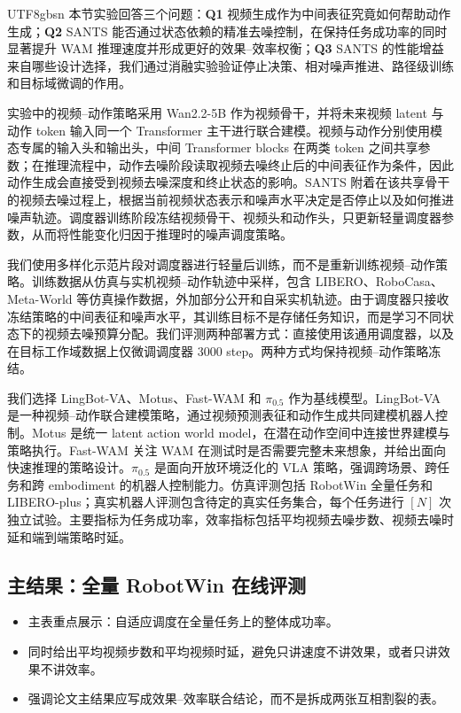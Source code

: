 \documentclass{article}
\begin{document}
\begin{CJK*}{UTF8}{gbsn}
本节实验回答三个问题：\textbf{Q1} 视频生成作为中间表征究竟如何帮助动作生成；\textbf{Q2} SANTS 能否通过状态依赖的精准去噪控制，在保持任务成功率的同时显著提升 WAM 推理速度并形成更好的效果--效率权衡；\textbf{Q3} SANTS 的性能增益来自哪些设计选择，我们通过消融实验验证停止决策、相对噪声推进、路径级训练和目标域微调的作用。

实验中的视频--动作策略采用 Wan2.2-5B 作为视频骨干，并将未来视频 latent 与动作 token 输入同一个 Transformer 主干进行联合建模。视频与动作分别使用模态专属的输入头和输出头，中间 Transformer blocks 在两类 token 之间共享参数；在推理流程中，动作去噪阶段读取视频去噪终止后的中间表征作为条件，因此动作生成会直接受到视频去噪深度和终止状态的影响。SANTS 附着在该共享骨干的视频去噪过程上，根据当前视频状态表示和噪声水平决定是否停止以及如何推进噪声轨迹。调度器训练阶段冻结视频骨干、视频头和动作头，只更新轻量调度器参数，从而将性能变化归因于推理时的噪声调度策略。

我们使用多样化示范片段对调度器进行轻量后训练，而不是重新训练视频--动作策略。训练数据从仿真与实机视频--动作轨迹中采样，包含 LIBERO、RoboCasa、Meta-World 等仿真操作数据，外加部分公开和自采实机轨迹。由于调度器只接收冻结策略的中间表征和噪声水平，其训练目标不是存储任务知识，而是学习不同状态下的视频去噪预算分配。我们评测两种部署方式：直接使用该通用调度器，以及在目标工作域数据上仅微调调度器 \(3000\) step。两种方式均保持视频--动作策略冻结。

我们选择 LingBot-VA、Motus、Fast-WAM 和 \(\pi_{0.5}\) 作为基线模型。LingBot-VA 是一种视频--动作联合建模策略，通过视频预测表征和动作生成共同建模机器人控制。Motus 是统一 latent action world model，在潜在动作空间中连接世界建模与策略执行。Fast-WAM 关注 WAM 在测试时是否需要完整未来想象，并给出面向快速推理的策略设计。\(\pi_{0.5}\) 是面向开放环境泛化的 VLA 策略，强调跨场景、跨任务和跨 embodiment 的机器人控制能力。仿真评测包括 RobotWin 全量任务和 LIBERO-plus；真实机器人评测包含待定的真实任务集合，每个任务进行 \([N]\) 次独立试验。主要指标为任务成功率，效率指标包括平均视频去噪步数、视频去噪时延和端到端策略时延。

\subsection{主结果：全量 RobotWin 在线评测}

\begin{itemize}
  \item 主表重点展示：自适应调度在全量任务上的整体成功率。
  \item 同时给出平均视频步数和平均视频时延，避免只讲速度不讲效果，或者只讲效果不讲效率。
  \item 强调论文主结果应写成效果--效率联合结论，而不是拆成两张互相割裂的表。
\end{itemize}


\end{CJK*}
\end{document}
